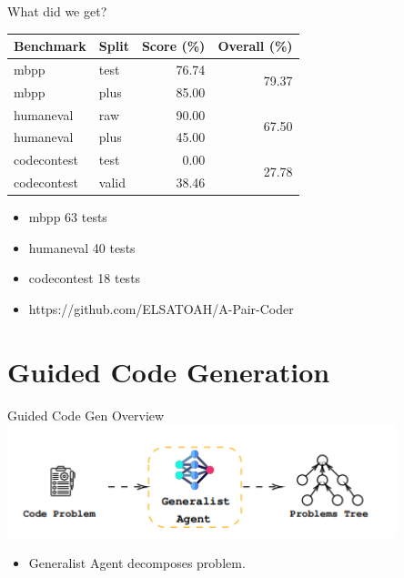 \documentclass{beamer}
\begin{document}
	\begin{frame}{What did we get?}
	  \begin{table}
	    \centering
	    \begin{tabular}{l l r r}
	      \toprule
	      \textbf{Benchmark} & \textbf{Split} & \textbf{Score (\%)} & \textbf{Overall (\%)} \\
	      \midrule
	      mbpp        & test  & 76.74 & \multirow{2}{*}{79.37} \\
	      mbpp        & plus  & 85.00 & \\
	      \midrule
	      humaneval   & raw   & 90.00 & \multirow{2}{*}{67.50} \\
	      humaneval   & plus  & 45.00 & \\
	      \midrule
	      codecontest & test  &  0.00 & \multirow{2}{*}{27.78} \\
	      codecontest & valid & 38.46 & \\
	      \bottomrule
	    \end{tabular}
	  \end{table}
	   \begin{itemize}
	    \item mbpp 63 tests
	    \item humaneval 40 tests
	    \item codecontest 18 tests
	    \item https://github.com/ELSATOAH/A-Pair-Coder
	  \end{itemize}
	\end{frame}



	
	\section{Guided Code Generation}
	\begin{frame}{Guided Code Gen Overview}
	\includegraphics[width=0.85\textwidth]{genAgent.png}
	  \begin{itemize}
	    \item Generalist Agent decomposes problem. 
	  \end{itemize}
	\end{frame}
	
\end{document}
